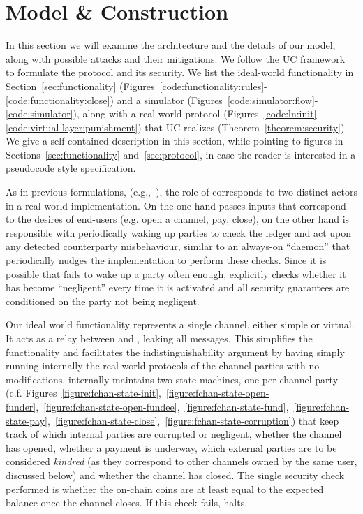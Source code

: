 \section{Model \& Construction}
  In this section we will examine the architecture and the details of our model,
  along with possible attacks and their mitigations. We follow the UC
  framework~\cite{uc} to formulate the protocol and its security. We list the
  ideal-world functionality \fchan in Section~\ref{sec:functionality}
  (Figures~\ref{code:functionality:rules}-\ref{code:functionality:close}) and a
  simulator \simulator (Figures~\ref{code:simulator:flow}-\ref{code:simulator}),
  along with a real-world protocol \pchan
  (Figures~\ref{code:ln:init}-\ref{code:virtual-layer:punishment}) that
  UC-realizes \fchan (Theorem~\ref{theorem:security}). We give a self-contained
  description in this section, while pointing to figures in
  Sections~\ref{sec:functionality} and~\ref{sec:protocol}, in case
  the reader is interested in a pseudocode style specification. 
 
  As in previous formulations, (e.g.,~\cite{DBLP:conf/csfw/KiayiasL20}), the role of \environment
  corresponds to two distinct actors in a real world implementation. On the one
  hand \environment passes inputs that correspond to the desires of end-users
  (e.g. open a channel, pay, close), on the other hand \environment is
  responsible with periodically waking up parties to check the ledger and act
  upon any detected counterparty misbehaviour, similar to an always-on
  ``daemon'' that periodically nudges the implementation to perform these
  checks. Since it is possible that \environment fails to wake up a party often
  enough, \pchan explicitly checks whether it has become ``negligent'' every
  time it is activated and all security guarantees are conditioned on the party
  not being negligent.

  Our ideal world functionality \fchan represents a single channel, either
  simple or virtual. It acts as a relay between \adversary and \environment,
  leaking all messages. This simplifies the functionality and facilitates the
  indistinguishability argument by having \simulator simply running internally
  the real world protocols of the channel parties \pchan with no modifications.
  \fchan internally maintains two state machines, one per channel party (c.f.
  Figures~\ref{figure:fchan-state-init},~\ref{figure:fchan-state-open-funder},~\ref{figure:fchan-state-open-fundee},~\ref{figure:fchan-state-fund},~\ref{figure:fchan-state-pay},~\ref{figure:fchan-state-close},~\ref{figure:fchan-state-corruption})
  that keep track of which internal parties are corrupted or negligent, whether
  the channel has opened, whether a payment is underway, which external parties
  are to be considered \emph{kindred} (as they correspond to other channels owned by
  the same user, discussed below) and whether the channel has closed. The single security check
  performed is whether the on-chain coins are at least equal to the expected
  balance once the channel closes. If this check fails, \fchan halts.

